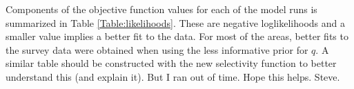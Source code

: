\documentclass[]{article}
\begin{document}
Components of the objective function values for each of the model runs is summarized in Table \ref{Table:likelihoods}. These are negative loglikelihoods and a smaller value implies a better fit to the data.  For most of the areas, better fits to the survey data were obtained when using the less informative prior for $q$.  A similar table should be constructed with the new selectivity function to better understand this (and explain it). But I ran out of time.  Hope this helps.  Steve.





\newpage






% 
% 
% 
% 
% 
\end{document}
